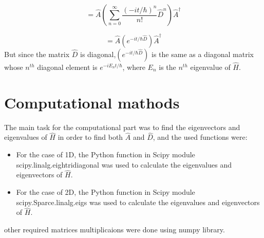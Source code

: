 \documentclass[10pt, a4paper]{article}
\begin{document}
\begin{adjustwidth}{1cm}{}
    \begin{equation*}
        = \hat{A}\left(\sum_{n=0}^{\infty} \frac{{(-it/\hbar)}^{n}}{n!}\hat{D}^n\right)\hat{A}^\dagger
    \end{equation*}

    \begin{equation*}
        = \hat{A}\left(e^{-it/\hbar \hat{D}}\right)\hat{A}^\dagger
    \end{equation*}
    But since the matrix $\hat{D}$ is diagonal,$\left(e^{-it/\hbar \hat{D}}\right)$ is the same as a diagonal matrix whose $n^{th}$ diagonal element is $e^{-iE_nt/\hbar}$, where $E_n$ is the $n^{th}$ eigenvalue of $\hat{H}$.
    \end{adjustwidth}


    
    \section{{\Large \textbf{Computational mathods}}}
    \begin{adjustwidth}{1cm}{}
    The main task for the computational part was to find the eigenvectors and eigenvalues of $\hat{H}$ in order to find both $\hat{A}$ and $\hat{D}$, and the used functions were:
    \begin{itemize}
        \item For the case of 1D, the Python function in Scipy module scipy.linalg.eightridiagonal was used to calculate the eigenvalues and eigenvectors of $\hat{H}$.
        \item For the case of 2D, the Python function in Scipy module scipy.Sparce.linalg.eigs was used to calculate the eigenvalues and eigenvectors of $\hat{H}$.
    \end{itemize}
    other required matrices multiplicaions were done using numpy library.
    \end{adjustwidth}
\end{document}

